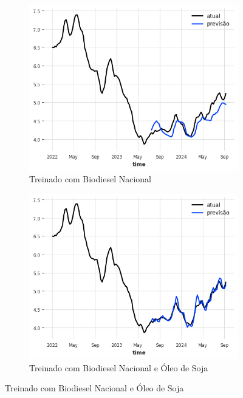 \begin{figure}[htbp]
	\centering
	\begin{subfigure}[b]{0.45\textwidth}
		\centering
		\includegraphics[width=\textwidth]{figuras/darnn_takens_brasil_plot.png} %
		\caption{Treinado com Biodiesel Nacional \newline}
		\label{fig:darnn_takens_brasil_plot}
	\end{subfigure}
	\hfill
	\begin{subfigure}[b]{0.45\textwidth}
		\centering
		\includegraphics[width=\textwidth]{figuras/darnn_takens_brasil_oil_plot.png} %
		\caption{Treinado com Biodiesel Nacional e Óleo de Soja}
		\label{fig:darnn_takens_brasil_oil_plot}
	\end{subfigure}


\end{figure}
